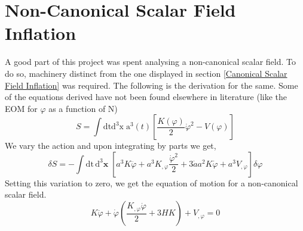 \documentclass[aps,prd,reprint,preprintnumbers,showpacs,floatfix,nofootinbib,superscript address]{revtex4-2}
\begin{document}
\section{Non-Canonical Scalar Field Inflation} \label{Non-Canonical Scalar Field Inflation}
A good part of this project was spent analysing a non-canonical scalar field. To do so, machinery distinct from the one displayed in section \ref{Canonical Scalar Field Inflation} was required. The following is the derivation for the same. Some of the equations derived have not been found elsewhere in literature (like the EOM for $\varphi$ as a function of N)
\begin{equation} \label{13}
    S = \int \text{dt}\text{d}^3\text{x} \; \text{a}^3(t) \left[ \frac{K(\varphi)}{2}\dot{\varphi}^2 - V(\varphi) \right]
\end{equation}
We vary the action and upon integrating by parts we get,
\begin{equation}
    \delta S = - \int \text{dt}\,\text{d}^3\textbf{x} \; \left[ a^3 K \ddot{\varphi} + a^3K_{,\varphi} \frac{\dot{\varphi}^2}{2}  +  3\dot{a} a^2 K \dot{\varphi} + a^3V_{,\varphi}  \right]\delta \varphi
\end{equation}
Setting this variation to zero, we get the equation of motion for a non-canonical scalar field.
\begin{equation} \label{16}
    K \ddot{\varphi} + \dot{\varphi} \left(\frac{K_{,\varphi} \dot{\varphi}}{2} + 3H K \right) + V_{,\varphi}   = 0
\end{equation}
\newpage
\,
\newpage
\printbibliography
\end{document}
